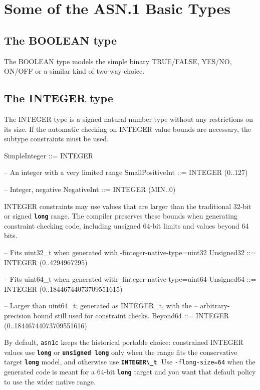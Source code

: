 \documentclass[english,oneside,12pt]{book}
\newcommand{\code}[1]{\texttt{\textbf{\lstinline{#1}}}}
\newcommand{\cmd}[1]{\texttt{#1}}
\begin{document}
\section{Some of the ASN.1 Basic Types}


\subsection{The BOOLEAN type}

The BOOLEAN type models the simple binary TRUE/FALSE, YES/NO, ON/OFF
or a similar kind of two-way choice.


\subsection{The INTEGER type}

The INTEGER type is a signed natural number type without any restrictions
on its size. If the automatic checking on INTEGER value bounds are
necessary, the subtype constraints must be used.
\begin{asn}
SimpleInteger ::= INTEGER

-- An integer with a very limited range
SmallPositiveInt ::= INTEGER (0..127)

-- Integer, negative
NegativeInt ::= INTEGER (MIN..0)
\end{asn}

INTEGER constraints may use values that are larger than the traditional
32-bit or signed \code{long} range. The compiler preserves these bounds when
generating constraint checking code, including unsigned 64-bit limits and
values beyond 64 bits.
\begin{asn}
-- Fits uint32\_t when generated with -finteger-native-type=uint32
Unsigned32 ::= INTEGER (0..4294967295)

-- Fits uint64\_t when generated with -finteger-native-type=uint64
Unsigned64 ::= INTEGER (0..18446744073709551615)

-- Larger than uint64\_t; generated as INTEGER\_t, with the
-- arbitrary-precision bound still used for constraint checks.
Beyond64 ::= INTEGER (0..18446744073709551616)
\end{asn}

By default, \cmd{asn1c} keeps the historical portable choice: constrained
INTEGER values use \code{long} or \code{unsigned long} only when the range fits
the conservative target \code{long} model, and otherwise use \code{INTEGER\_t}.
Use \cmd{-flong-size=64} when the generated code is meant for a 64-bit
\code{long} target and you want that default policy to use the wider native
range.
\end{document}
